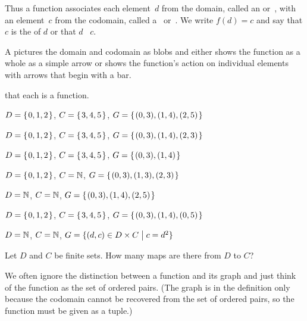 \documentclass{ibl}
\begin{document}
\noindent Thus a function associates each element~$d$ from the domain,
called an  or~,
with an element~$c$ from the codomain, 
called a~ or~. 
We write $f(d)=c$ and say that $c$ is the  of $d$ 
or that $d$ ~$c$.

A  pictures the domain and 
codomain as blobs and 
either shows the function as a whole as a simple arrow   
or shows the function's action on individual elements 
with arrows that begin with a bar.
\begin{center}
  \hspace{8em}
\end{center}

\begin{ex} \pord{} that each is a function.\label{FindFunctions}
\begin{exes}
\item $D=\mbox{$\{\hspace{0.1em}0,1,2\hspace{0.1em}\}$}$, $C=\mbox{$\{\hspace{0.1em}3,4,5\hspace{0.1em}\}$}$,
  $G=\mbox{$\{\hspace{0.1em}(0,3), (1,4), (2,5)\hspace{0.1em}\}$}$    
\item $D=\mbox{$\{\hspace{0.1em}0,1,2\hspace{0.1em}\}$}$, $C=\mbox{$\{\hspace{0.1em}3,4,5\hspace{0.1em}\}$}$,
  $G=\mbox{$\{\hspace{0.1em}(0,3), (1,4), (2,3)\hspace{0.1em}\}$}$    
\item $D=\mbox{$\{\hspace{0.1em}0,1,2\hspace{0.1em}\}$}$, $C=\mbox{$\{\hspace{0.1em}3,4,5\hspace{0.1em}\}$}$,
  $G=\mbox{$\{\hspace{0.1em}(0,3), (1,4)\hspace{0.1em}\}$}$    
\item $D=\mbox{$\{\hspace{0.1em}0,1,2\hspace{0.1em}\}$}$, $C=\mathbb{N}$,
  $G=\mbox{$\{\hspace{0.1em}(0,3), (1,3), (2,3)\hspace{0.1em}\}$}$    
\item $D=\mathbb{N}$, $C=\mathbb{N}$,
  $G=\mbox{$\{\hspace{0.1em}(0,3), (1,4), (2,5)\hspace{0.1em}\}$}$    
\item $D=\mbox{$\{\hspace{0.1em}0,1,2\hspace{0.1em}\}$}$, $C=\mbox{$\{\hspace{0.1em}3,4,5\hspace{0.1em}\}$}$,
  $G=\mbox{$\{\hspace{0.1em}(0,3), (1,4), (0,5)\hspace{0.1em}\}$}$    
\item $D=\mathbb{N}$, $C=\mathbb{N}$,
  $G=\{(d,c)\in D\times C \bigm| c=d^2\}$    
\end{exes}
\end{ex}

\begin{ex}
Let $D$ and $C$ be finite sets.
How many maps are there from $D$ to $C$?
\end{ex}

We often ignore the distinction between a function and its graph
and just
think of the function as the set of ordered pairs.
(The graph is in the definition only 
because the codomain cannot be recovered
from the set of ordered pairs, so the function must be 
given as a tuple.)
\end{document}
